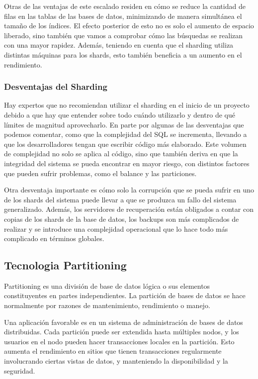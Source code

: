\documentclass[twoside,twocolumn]{article}
\begin{document}
Otras de las ventajas de este escalado residen en cómo se reduce la cantidad 
de filas en las tablas de las bases de datos, minimizando de manera simultánea
 el tamaño de los índices. El efecto posterior de esto no es solo el aumento de
  espacio liberado, sino también que vamos a comprobar cómo las búsquedas se
   realizan con una mayor rapidez. Además, teniendo en cuenta que el sharding 
   utiliza distintas máquinas para los shards, esto también beneficia a un 
   aumento en el rendimiento.
\subsubsection{Desventajas del Sharding}

Hay expertos que no recomiendan utilizar el sharding en el inicio de un proyecto 
debido a que hay que entender sobre todo cuándo utilizarlo y dentro de qué límites
 de magnitud aprovecharlo. En parte por algunas de las desventajas que podemos 
 comentar, como que la complejidad del SQL se incrementa, llevando a que los 
 desarrolladores tengan que escribir código más elaborado. Este volumen de 
 complejidad no solo se aplica al código, sino que también deriva en que la 
 integridad del sistema se pueda encontrar en mayor riesgo, con distintos 
 factores que pueden sufrir problemas, como el balance y las particiones.

Otra desventaja importante es cómo solo la corrupción que se pueda sufrir 
en uno de los shards del sistema puede llevar a que se produzca un fallo del 
sistema generalizado. Además, los servidores de recuperación están obligados 
a contar con copias de los shards de la base de datos, los backups son más 
complicados de realizar y se introduce una complejidad operacional que lo hace
 todo más complicado en términos globales.
 \subsection{Tecnologia Partitioning}
 Partitioning es una división de base de datos lógica o sus elementos
  constituyentes en partes independientes. La partición de bases de datos
   se hace normalmente por razones de mantenimiento, rendimiento o manejo. 

Una aplicación favorable es en un sistema de administración de bases de datos 
distribuidas. Cada partición puede ser extendida hasta múltiples nodos, y los 
usuarios en el nodo pueden hacer transacciones locales en la partición. Esto 
aumenta el rendimiento en sitios que tienen transacciones regularmente 
involucrando ciertas vistas de datos, y manteniendo la disponibilidad y 
la seguridad. 
\end{document}
